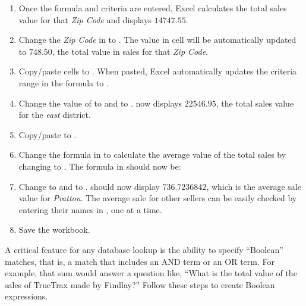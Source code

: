 \begin{enumbox}
\begin{enumerate}
		\item Once the formula and criteria are entered, Excel calculates the total sales value for that \textit{Zip Code} and displays $ 14747.55 $.
		\item Change the \textit{Zip Code} in  to . The value in cell  will be automatically updated to $ 748.50 $, the total value in sales for that \textit{Zip Code}.
		\item Copy/paste cells  to . When pasted, Excel automatically updates the criteria range in the formula to .
		\item Change the value of  to  and  to .  now displays $ 22546.95 $, the total sales value for the \textit{east} district.
		\item Copy/paste  to .
		\item Change the formula in  to calculate the average value of the total sales by changing  to . The formula in  should now be: 
		\item Change  to  and  to .  should now display $ 736.7236842 $, which is the average sale value for \textit{Pratton}. The average sale for other sellers can be easily checked by entering their names in , one at a time.
		\item Save the  workbook.
	\end{enumerate}
\end{enumbox}
	
A critical feature for any database lookup is the ability to specify ``Boolean'' matches, that is, a match that includes an AND term or an OR term. For example, that sum would answer a question like, ``What is the total value of the sales of TrueTrax made by Findlay?'' Follow these steps to create Boolean expressions.

